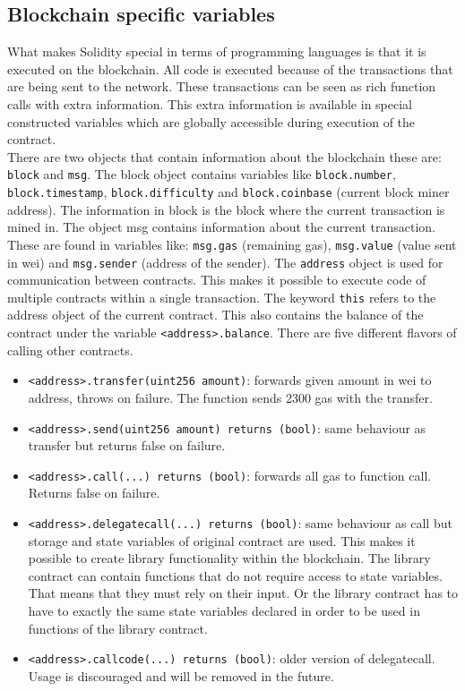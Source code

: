 \documentclass[a4paper]{article}
\begin{document}
\subsection{Blockchain specific variables}
What makes Solidity special in terms of programming languages is that it is executed on the blockchain. All code is executed because of the transactions that are being sent to the network. These transactions can be seen as rich function calls with extra information. This extra information is available in special constructed variables which are globally accessible during execution of the contract.\\
There are two objects that contain information about the blockchain these are: \texttt{block} and \texttt{msg}. The block object contains variables like \texttt{block.number}, \texttt{block.timestamp}, \texttt{block.difficulty} and \texttt{block.coinbase} (current block miner address). The information in block is the block where the current transaction is mined in. The object msg contains information about the current transaction. These are found in variables like: \texttt{msg.gas} (remaining gas), \texttt{msg.value} (value sent in wei) and \texttt{msg.sender} (address of the sender).
The \texttt{address} object is used for communication between contracts. This makes it possible to execute code of multiple contracts within a single transaction. The keyword \texttt{this} refers to the address object of the current contract. This also contains the balance of the contract under the variable \texttt{<address>.balance}. There are five different flavors of calling other contracts.
\begin{itemize}
    \item \texttt{<address>.transfer(uint256 amount)}: forwards given amount in wei to address, throws on failure. The function sends 2300 gas with the transfer. 
    \item \texttt{<address>.send(uint256 amount) returns (bool)}: same behaviour as transfer but returns false on failure.
    \item \texttt{<address>.call(...) returns (bool)}: forwards all gas to function call. Returns false on failure.
    \item \texttt{<address>.delegatecall(...) returns (bool)}: same behaviour as call but storage and state variables of original contract are used. This makes it possible to create library functionality within the blockchain. The library contract can contain functions that do not require access to state variables. That means that they must rely on their input. Or the library contract has to have to exactly the same state variables declared in order to be used in functions of the library contract.
    \item \texttt{<address>.callcode(...) returns (bool)}: older version of delegatecall. Usage is discouraged and will be removed in the future.
\end{itemize}
\end{document}
